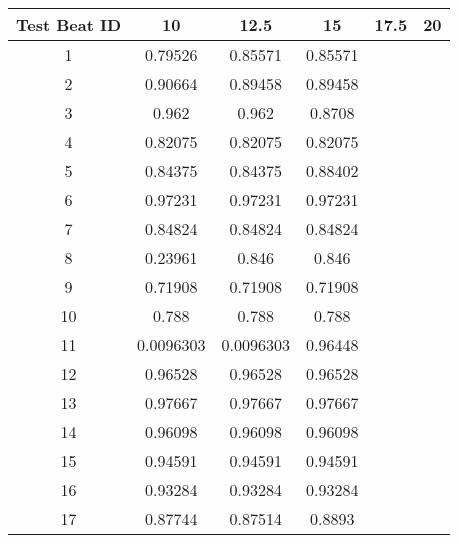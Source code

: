 \begin{tabular}{|c|c|c|c|c|c|}
\hline 
Test Beat ID & 10 & 12.5 & 15 & 17.5 & 20 \\ 
\hline 
1 & 0.79526 & 0.85571 & 0.85571 &  &  \\ 
2 & 0.90664 & 0.89458 & 0.89458 &  &  \\ 
3 & 0.962 & 0.962 & 0.8708 &  &  \\ 
4 & 0.82075 & 0.82075 & 0.82075 &  &  \\ 
5 & 0.84375 & 0.84375 & 0.88402 &  &  \\ 
6 & 0.97231 & 0.97231 & 0.97231 &  &  \\ 
7 & 0.84824 & 0.84824 & 0.84824 &  &  \\ 
8 & 0.23961 & 0.846 & 0.846 &  &  \\ 
9 & 0.71908 & 0.71908 & 0.71908 &  &  \\ 
10 & 0.788 & 0.788 & 0.788 &  &  \\ 
11 & 0.0096303 & 0.0096303 & 0.96448 &  &  \\ 
12 & 0.96528 & 0.96528 & 0.96528 &  &  \\ 
13 & 0.97667 & 0.97667 & 0.97667 &  &  \\ 
14 & 0.96098 & 0.96098 & 0.96098 &  &  \\ 
15 & 0.94591 & 0.94591 & 0.94591 &  &  \\ 
16 & 0.93284 & 0.93284 & 0.93284 &  &  \\ 
17 & 0.87744 & 0.87514 & 0.8893 &  &  \\ 
\hline 
\end{tabular}